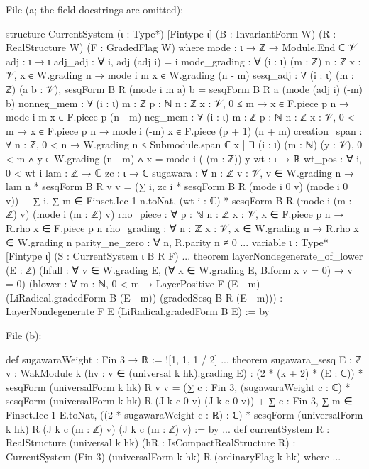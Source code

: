 {\raggedright\noindent File  (a; the field
docstrings are omitted):\par}
\begin{leancode}
structure CurrentSystem (ι : Type*) [Fintype ι] (B : InvariantForm W) (R : RealStructure W)
    (F : GradedFlag W) where
  mode : ι → ℤ → Module.End ℂ 𝒱
  adj : ι → ι
  adj_adj : ∀ i, adj (adj i) = i
  mode_grading : ∀ (i : ι) (m : ℤ) {n : ℤ} {x : 𝒱}, x ∈ W.grading n →
    mode i m x ∈ W.grading (n - m)
  sesq_adj : ∀ (i : ι) (m : ℤ) (a b : 𝒱),
    sesqForm B R (mode i m a) b = sesqForm B R a (mode (adj i) (-m) b)
  nonneg_mem : ∀ (i : ι) {m : ℤ} {p : ℕ} {n : ℤ} {x : 𝒱}, 0 ≤ m → x ∈ F.piece p n →
    mode i m x ∈ F.piece p (n - m)
  neg_mem : ∀ (i : ι) {m : ℤ} {p : ℕ} {n : ℤ} {x : 𝒱}, 0 < m → x ∈ F.piece p n →
    mode i (-m) x ∈ F.piece (p + 1) (n + m)
  creation_span : ∀ {n : ℤ}, 0 < n → W.grading n ≤ Submodule.span ℂ
    {x | ∃ (i : ι) (m : ℕ) (y : 𝒱), 0 < m ∧ y ∈ W.grading (n - m) ∧ x = mode i (-(m : ℤ)) y}
  wt : ι → ℝ
  wt_pos : ∀ i, 0 < wt i
  lam : ℤ → ℂ
  zc : ι → ℂ
  sugawara : ∀ {n : ℤ} {v : 𝒱}, v ∈ W.grading n →
    lam n * sesqForm B R v v =
      (∑ i, zc i * sesqForm B R (mode i 0 v) (mode i 0 v)) +
        ∑ i, ∑ m ∈ Finset.Icc 1 n.toNat,
          (wt i : ℂ) * sesqForm B R (mode i (m : ℤ) v) (mode i (m : ℤ) v)
  rho_piece : ∀ {p : ℕ} {n : ℤ} {x : 𝒱}, x ∈ F.piece p n → R.rho x ∈ F.piece p n
  rho_grading : ∀ {n : ℤ} {x : 𝒱}, x ∈ W.grading n → R.rho x ∈ W.grading n
  parity_ne_zero : ∀ n, R.parity n ≠ 0
...
variable {ι : Type*} [Fintype ι] (S : CurrentSystem ι B R F)
...
theorem layerNondegenerate_of_lower (E : ℤ)
    (hfull : ∀ v ∈ W.grading E, (∀ x ∈ W.grading E, B.form x v = 0) → v = 0)
    (hlower : ∀ m : ℕ, 0 < m →
      LayerPositive F (E - m) (LiRadical.gradedForm B (E - m)) (gradedSesq B R (E - m))) :
    LayerNondegenerate F E (LiRadical.gradedForm B E) := by
\end{leancode}
{\raggedright\noindent File  (b):\par}
\begin{leancode}
def sugawaraWeight : Fin 3 → ℝ := ![1, 1, 1 / 2]
...
theorem sugawara_sesq {E : ℤ} {v : WakModule k} (hv : v ∈ (universal k hk).grading E) :
    (2 * (k + 2) * (E : ℂ)) * sesqForm (universalForm k hk) R v v =
      (∑ c : Fin 3, (sugawaraWeight c : ℂ) *
          sesqForm (universalForm k hk) R (J k c 0 v) (J k c 0 v)) +
        ∑ c : Fin 3, ∑ m ∈ Finset.Icc 1 E.toNat, ((2 * sugawaraWeight c : ℝ) : ℂ) *
          sesqForm (universalForm k hk) R (J k c (m : ℤ) v) (J k c (m : ℤ) v) := by
...
def currentSystem {R : RealStructure (universal k hk)} (hR : IsCompactRealStructure R) :
    CurrentSystem (Fin 3) (universalForm k hk) R (ordinaryFlag k hk) where
  ...
\end{leancode}

